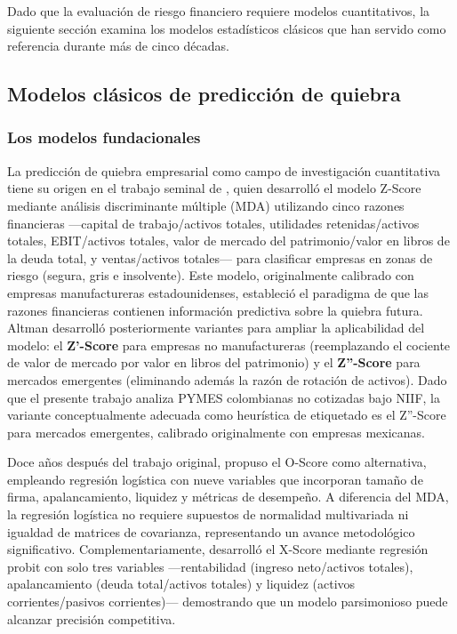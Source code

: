 \documentclass[12pt, letterpaper]{article}
\begin{document}
Dado que la evaluaci\'on de riesgo financiero requiere modelos cuantitativos, la siguiente secci\'on examina los modelos estad\'isticos cl\'asicos que han servido como referencia durante m\'as de cinco d\'ecadas.

\subsection{Modelos cl\'asicos de predicci\'on de quiebra}
\label{sec:clasicos}

\subsubsection{Los modelos fundacionales}

La predicci\'on de quiebra empresarial como campo de investigaci\'on cuantitativa tiene su origen en el trabajo seminal de \citet{Altman1968}, quien desarroll\'o el modelo Z-Score mediante an\'alisis discriminante m\'ultiple (MDA) utilizando cinco razones financieras ---capital de trabajo/activos totales, utilidades retenidas/activos totales, EBIT/activos totales, valor de mercado del patrimonio/valor en libros de la deuda total, y ventas/activos totales--- para clasificar empresas en zonas de riesgo (segura, gris e insolvente). Este modelo, originalmente calibrado con empresas manufactureras estadounidenses, estableci\'o el paradigma de que las razones financieras contienen informaci\'on predictiva sobre la quiebra futura. Altman desarroll\'o posteriormente variantes para ampliar la aplicabilidad del modelo: el \textbf{Z'-Score} para empresas no manufactureras (reemplazando el cociente de valor de mercado por valor en libros del patrimonio) y el \textbf{Z''-Score} para mercados emergentes (eliminando adem\'as la raz\'on de rotaci\'on de activos). Dado que el presente trabajo analiza PYMES colombianas no cotizadas bajo NIIF, la variante conceptualmente adecuada como heur\'istica de etiquetado es el Z''-Score para mercados emergentes, calibrado originalmente con empresas mexicanas.

Doce a\~nos despu\'es del trabajo original, \citet{Ohlson1980} propuso el O-Score como alternativa, empleando regresi\'on log\'istica con nueve variables que incorporan tama\~no de firma, apalancamiento, liquidez y m\'etricas de desempe\~no. A diferencia del MDA, la regresi\'on log\'istica no requiere supuestos de normalidad multivariada ni igualdad de matrices de covarianza, representando un avance metodol\'ogico significativo. Complementariamente, \citet{Zmijewski1984} desarroll\'o el X-Score mediante regresi\'on probit con solo tres variables ---rentabilidad (ingreso neto/activos totales), apalancamiento (deuda total/activos totales) y liquidez (activos corrientes/pasivos corrientes)--- demostrando que un modelo parsimonioso puede alcanzar precisi\'on competitiva.
\end{document}
